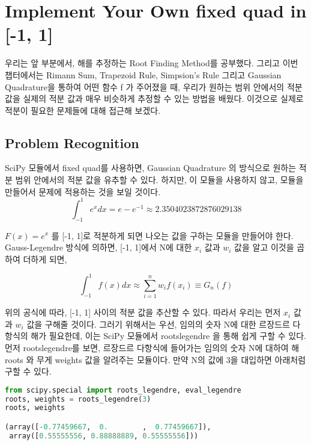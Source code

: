 \documentclass[11pt]{article}
\title{}
\author{MinWook Kang}
\date{\today}
\begin{document}
\maketitle
\pagebreak





\section{Implement Your Own fixed quad in [-1, 1]}

우리는 앞 부분에서, 해를 추정하는 Root Finding Method를 공부했다. 그리고 이번 챕터에서는 Rimann Sum, Trapezoid Rule, Simpsion's Rule 그리고 Gaussian Quadrature을 통하여 어떤 함수 f 가 주어졌을 때, 우리가 원하는 범위 안에서의 적분 값을 실제의 적분 값과 매우 비슷하게 추정할 수 있는 방법을 배웠다. 이것으로 실제로 적분이 필요한 문제들에 대해 접근해 보겠다.
\subsection{Problem Recognition} 
SciPy 모듈에서 fixed quad를 사용하면, Gaussian Quadrature 의 방식으로 원하는 적분 범위 안에서의 적분 값을 유추할 수 있다. 하지만, 이 모듈을 사용하지 않고, 모듈을 만들어서 문제에 적용하는 것을 보일 것이다. 
\begin{equation}
\int_{-1}^{1} e^x dx = e - e^{-1} \approx 2.3504023872876029138
\end{equation}

$F(x) = e^x$ 를 [-1, 1]로 적분하게 되면 나오는 값을 구하는 모듈을 만들어야 한다. Gauss-Legendre 방식에 의하면, [-1, 1]에서 N에 대한 $x_i$ 값과 $w_i$ 값을 알고 이것을 곱하여 더하게 되면, 

\begin{equation}
\int_{-1}^1 f(x) dx \approx \sum_{i = 1}^n w_i f(x_i) \equiv G_n(f)
\end{equation}

위의 공식에 따라, [-1, 1] 사이의 적분 값을 추산할 수 있다. 따라서 우리는 먼저 $x_i$ 값과 $w_i$ 값을 구해줄 것이다. 그러기 위해서는 우선, 임의의 숫자 N에 대한 르장드르 다항식의 해가 필요한데, 이는  SciPy 모듈에서 roots\textunderscore legendre 을 통해 쉽게 구할 수 있다. 
먼저 roots\textunderscore legendre를 보면, 르장드르 다항식에 들어가는 임의의 숫자 N에 대하여 해 roots 와 무게 weights 값을 알려주는 모듈이다. 만약  N의 값에 3을 대입하면 아래처럼 구할 수 있다.

\begin{lstlisting}[language=Python]
from scipy.special import roots_legendre, eval_legendre
roots, weights = roots_legendre(3)
roots, weights

(array([-0.77459667,  0.        ,  0.77459667]),
 array([0.55555556, 0.88888889, 0.55555556]))
\end{lstlisting}
\end{document}

